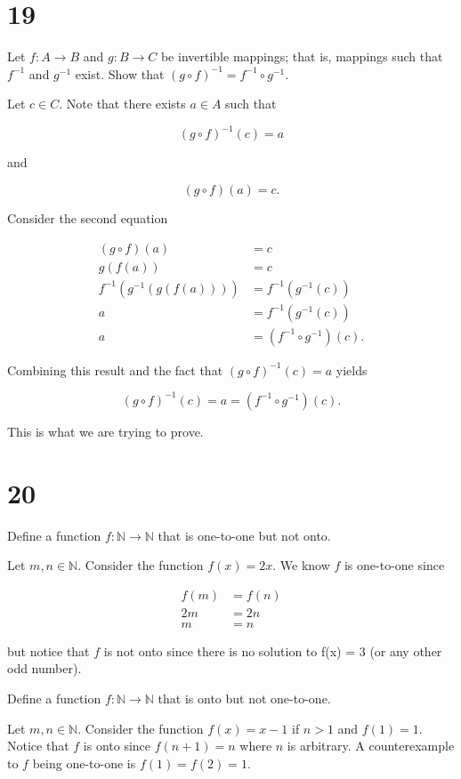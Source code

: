\documentclass[a4paper]{article}
\begin{document}
\section*{19}

Let $f: A \rightarrow B$ and $g: B \rightarrow C$ be invertible mappings; that is, mappings such that $f^{-1}$ and $g^{-1}$ exist. Show that $(g \circ f)^{-1} = f^{-1} \circ g^{-1}$.

\vspace{\baselineskip}

Let $c \in C$. Note that there exists $a \in A$ such that 

$$(g \circ f)^{-1}(c) = a$$

and

$$(g \circ f)(a) = c.$$

Consider the second equation

\begin{align*}
(g \circ f)(a) &= c \\ 
g(f(a)) &= c \\
f^{-1}(g^{-1}(g(f(a)))) &= f^{-1}(g^{-1}(c)) \\
a &= f^{-1}(g^{-1}(c)) \\
a &= (f^{-1} \circ g^{-1}) (c).
\end{align*}

Combining this result and the fact that $(g \circ f)^{-1}(c) = a$ yields

$$(g \circ f)^{-1}(c) = a = (f^{-1} \circ g^{-1})(c).$$

This is what we are trying to prove.


\section*{20}

Define a function $f: \mathbb{N} \rightarrow \mathbb{N}$ that is one-to-one but not onto.

\vspace{\baselineskip}

Let $m,n \in \mathbb{N}$. Consider the function $f(x) = 2x$. We know $f$ is one-to-one since

\begin{align*}
f(m) &= f(n) \\
2m &= 2n \\
m &= n
\end{align*}

but notice that $f$ is not onto since there is no solution to f(x) = 3 (or any other odd number).

\vspace{\baselineskip}

Define a function $f: \mathbb{N} \rightarrow \mathbb{N}$ that is onto but not one-to-one.

\vspace{\baselineskip}

Let $m,n \in \mathbb{N}$. Consider the function $f(x) = x - 1$ if $n > 1$ and $f(1) = 1$. Notice that $f$ is onto since $f(n+1) = n$ where $n$ is arbitrary. A counterexample to $f$ being one-to-one is $f(1) = f(2) = 1$.
\end{document}
